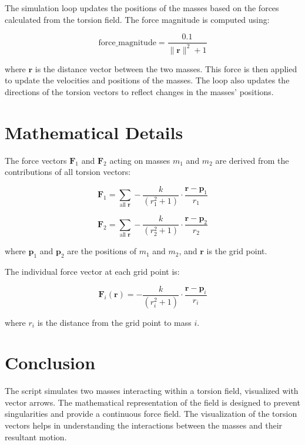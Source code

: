 \documentclass{article}
\begin{document}
The simulation loop updates the positions of the masses based on the forces calculated from the torsion field. The force magnitude is computed using:

\[
\text{force\_magnitude} = \frac{0.1}{\|\mathbf{r}\|^2 + 1}
\]

where \(\mathbf{r}\) is the distance vector between the two masses. This force is then applied to update the velocities and positions of the masses. The loop also updates the directions of the torsion vectors to reflect changes in the masses' positions.

\section{Mathematical Details}

The force vectors \(\mathbf{F}_1\) and \(\mathbf{F}_2\) acting on masses \(m_1\) and \(m_2\) are derived from the contributions of all torsion vectors:

\[
\mathbf{F}_1 = \sum_{\text{all } \mathbf{r}} -\frac{k}{(r_1^2 + 1)} \cdot \frac{\mathbf{r} - \mathbf{p}_1}{r_1}
\]

\[
\mathbf{F}_2 = \sum_{\text{all } \mathbf{r}} -\frac{k}{(r_2^2 + 1)} \cdot \frac{\mathbf{r} - \mathbf{p}_2}{r_2}
\]

where \(\mathbf{p}_1\) and \(\mathbf{p}_2\) are the positions of \(m_1\) and \(m_2\), and \(\mathbf{r}\) is the grid point.

The individual force vector at each grid point is:

\[
\mathbf{F}_{i}(\mathbf{r}) = -\frac{k}{(r_i^2 + 1)} \cdot \frac{\mathbf{r} - \mathbf{p}_i}{r_i}
\]

where \(r_i\) is the distance from the grid point to mass \(i\). 

\section{Conclusion}

The script simulates two masses interacting within a torsion field, visualized with vector arrows. The mathematical representation of the field is designed to prevent singularities and provide a continuous force field. The visualization of the torsion vectors helps in understanding the interactions between the masses and their resultant motion.
\end{document}
